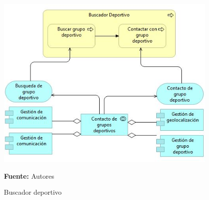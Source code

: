 \begin{figure}[!htb]
  \begin{center}
    \includegraphics[width=11cm]{./imagenes/application_usage/buscadordeportivo.png}
    \caption{Buscador deportivo}
    \label{fig:BP_BuscadorDeportivo}
    \textbf{Fuente:}  Autores
  \end{center}
\end{figure}

